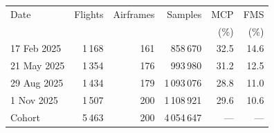 \begin{tabular}{lrrrrr}
\toprule
Date & Flights & Airframes & Samples & MCP & FMS \\
 & & & & (\%) & (\%) \\
\midrule
17 Feb 2025 & 1\,168 & 161 & 858\,670 & 32.5 & 14.6 \\
21 May 2025 & 1\,354 & 176 & 993\,980 & 31.2 & 12.5 \\
29 Aug 2025 & 1\,434 & 179 & 1\,093\,076 & 28.8 & 11.0 \\
1 Nov 2025 & 1\,507 & 200 & 1\,108\,921 & 29.6 & 10.6 \\
\midrule
Cohort & 5\,463 & 200 & 4\,054\,647 & --- & --- \\
\bottomrule
\end{tabular}
